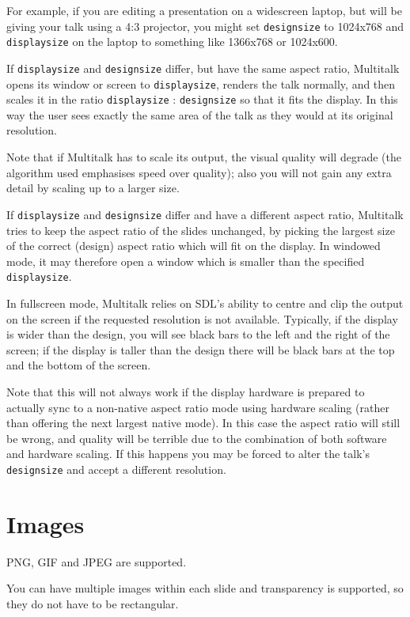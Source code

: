 \documentclass[12pt,a4paper,twoside]{article}
\renewcommand{\_}{\texttt{\symbol{95}}}
\begin{document}
For example, if you are editing a presentation on a widescreen
laptop, but will be giving your talk using a 4:3 projector,
you might set \verb^designsize^ to 1024x768 and \verb^displaysize^
on the laptop to something like 1366x768 or 1024x600.

If \verb^displaysize^ and \verb^designsize^ differ, but have the
same aspect ratio, Multitalk opens its window or screen to
\verb^displaysize^, renders the talk normally, and then scales
it in the ratio \verb^displaysize^ : \verb^designsize^ so that it
fits the display. In this way the user sees exactly the same area
of the talk as they would at its original resolution.

Note that if Multitalk has to scale its output, the visual quality
will degrade (the algorithm used emphasises speed over quality);
also you will not gain any extra detail by scaling up to a larger size.

If \verb^displaysize^ and \verb^designsize^ differ and have a
different aspect ratio, Multitalk tries to keep the aspect ratio
of the slides unchanged, by picking the largest size of the
correct (design) aspect ratio which will fit on the display.
In windowed mode, it may therefore open a window which is smaller
than the specified \verb^displaysize^.

In fullscreen mode, Multitalk
relies on SDL's ability to centre and clip the output on the screen if
the requested resolution is not available. Typically, if the display
is wider than the design, you will see black bars to the left and
the right of the screen; if the display is taller than the design
there will be black bars at the top and the bottom of the screen.

Note that this will not always work if the display hardware is prepared
to actually sync to a non-native aspect ratio mode using hardware
scaling (rather than offering the next largest native mode). In this
case the aspect ratio will still be wrong, and quality will be
terrible due to the combination of both software and hardware scaling.
If this happens you may be forced to alter the talk's \verb^designsize^
and accept a different resolution.

\section{Images}

PNG, GIF and JPEG are supported.

You can have multiple images within each slide and transparency is supported,
so they do not have to be rectangular.
\end{document}
